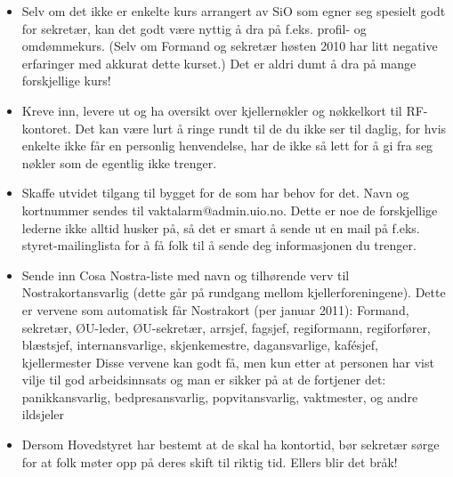 \begin{itemize}
\item Selv om det ikke er enkelte kurs arrangert av SiO som egner seg spesielt godt for sekretær, kan det godt være nyttig å dra på f.eks. profil- og omdømmekurs. (Selv om Formand og sekretær høsten 2010 har litt negative erfaringer med akkurat dette kurset.) Det er aldri dumt å dra på mange forskjellige kurs!
\item Kreve inn, levere ut og ha oversikt over kjellernøkler og nøkkelkort til RF-kontoret. Det kan være lurt å ringe rundt til de du ikke ser til daglig, for hvis enkelte ikke får en personlig henvendelse, har de ikke så lett for å gi fra seg nøkler som de egentlig ikke trenger.
\item Skaffe utvidet tilgang til bygget for de som har behov for det. Navn og kortnummer sendes til vaktalarm@admin.uio.no. Dette er noe de forskjellige lederne ikke alltid husker på, så det er smart å sende ut en mail på f.eks. styret-mailinglista for å få folk til å sende deg informasjonen du trenger.
\item Sende inn Cosa Nostra-liste med navn og tilhørende verv til Nostrakortansvarlig (dette går på rundgang mellom kjellerforeningene). 
	\subitem Dette er vervene som automatisk får Nostrakort (per januar 2011): Formand, sekretær, ØU-leder, ØU-sekretær, arrsjef, fagsjef, regiformann, regiforfører, blæstsjef, internansvarlige, skjenkemestre, dagansvarlige, kafésjef, kjellermester
	\subitem Disse vervene kan godt få, men kun etter at personen har vist vilje til god arbeidsinnsats og man er sikker på at de fortjener det: panikkansvarlig, bedpresansvarlig, popvitansvarlig, vaktmester, og andre ildsjeler
\item Dersom Hovedstyret har bestemt at de skal ha kontortid, bør sekretær sørge for at folk møter opp på deres skift til riktig tid. Ellers blir det bråk!  
\end{itemize}
